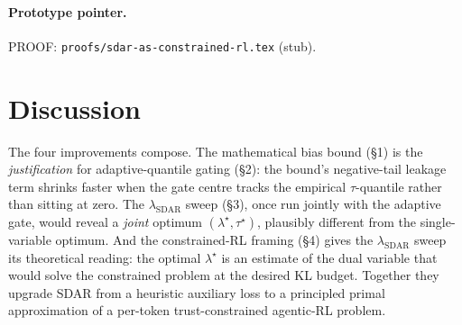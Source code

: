 \documentclass[11pt]{article}
\begin{document}
\paragraph{Prototype pointer.}  PROOF:
\texttt{proofs/sdar-as-constrained-rl.tex} (stub).

\section*{Discussion}

The four improvements compose.  The mathematical bias bound (\S 1) is the
\emph{justification} for adaptive-quantile gating (\S 2): the bound's
negative-tail leakage term shrinks faster when the gate centre tracks the
empirical $\tau$-quantile rather than sitting at zero.  The
$\lambda_{\mathrm{SDAR}}$ sweep (\S 3), once run jointly with the adaptive
gate, would reveal a \emph{joint} optimum
$(\lambda^\star, \tau^\star)$, plausibly different from the
single-variable optimum.  And the constrained-RL framing (\S 4) gives the
$\lambda_{\mathrm{SDAR}}$ sweep its theoretical reading: the optimal
$\lambda^\star$ is an estimate of the dual variable that would solve the
constrained problem at the desired KL budget.  Together they upgrade
SDAR from a heuristic auxiliary loss to a principled primal approximation
of a per-token trust-constrained agentic-RL problem.



\end{document}

